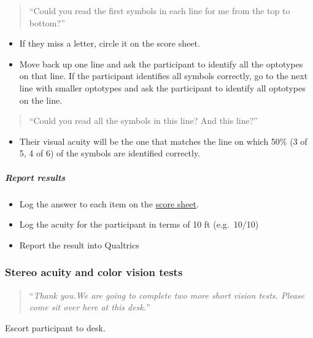 \documentclass[]{article}
\providecommand{\tightlist}{%
  \setlength{\itemsep}{0pt}\setlength{\parskip}{0pt}}
\let\oldsubparagraph\subparagraph
\renewcommand{\subparagraph}[1]{\oldsubparagraph{#1}\mbox{}}
\begin{document}
\begin{quote}
``Could you read the first symbols in each line for me from the top to
bottom?''
\end{quote}

\begin{itemize}
\tightlist
\item
  If they miss a letter, circle it on the score sheet.
\item
  Move back up one line and ask the participant to identify all the
  optotypes on that line. If the participant identifies all symbols
  correctly, go to the next line with smaller optotypes and ask the
  participant to identify all optotypes on the line.
\end{itemize}

\begin{quote}
``Could you read all the symbols in this line? And this line?''
\end{quote}

\begin{itemize}
\tightlist
\item
  Their visual acuity will be the one that matches the line on which
  50\% (3 of 5, 4 of 6) of the symbols are identified correctly.
\end{itemize}

\hypertarget{report-results}{%
\subparagraph{Report results}\label{report-results}}

\begin{itemize}
\tightlist
\item
  Log the answer to each item on the
  \href{vision-screening-score-sheet.html}{score sheet}.
\item
  Log the acuity for the participant in terms of 10 ft (e.g.~10/10)
\item
  Report the result into Qualtrics
\end{itemize}

\hypertarget{stereo-acuity-and-color-vision-tests}{%
\subsubsection{Stereo acuity and color vision
tests}\label{stereo-acuity-and-color-vision-tests}}

\begin{quote}
``\emph{Thank you.We are going to complete two more short vision tests.
Please come sit over here at this desk.}''
\end{quote}

Escort participant to desk.
\end{document}
